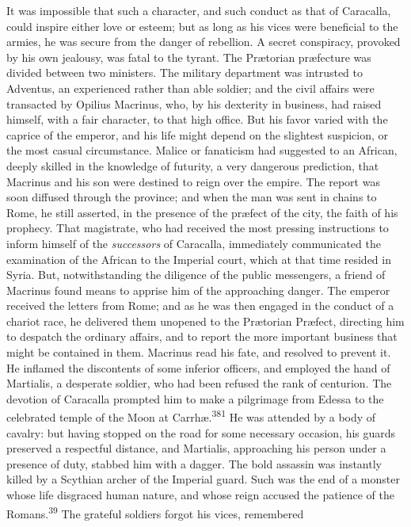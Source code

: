 It was impossible that such a character, and such conduct as that
of Caracalla, could inspire either love or esteem; but as long as
his vices were beneficial to the armies, he was secure from the
danger of rebellion. A secret conspiracy, provoked by his own
jealousy, was fatal to the tyrant. The Prætorian præfecture was
divided between two ministers. The military department was
intrusted to Adventus, an experienced rather than able soldier;
and the civil affairs were transacted by Opilius Macrinus, who,
by his dexterity in business, had raised himself, with a fair
character, to that high office. But his favor varied with the
caprice of the emperor, and his life might depend on the
slightest suspicion, or the most casual circumstance. Malice or
fanaticism had suggested to an African, deeply skilled in the
knowledge of futurity, a very dangerous prediction, that Macrinus
and his son were destined to reign over the empire. The report
was soon diffused through the province; and when the man was sent
in chains to Rome, he still asserted, in the presence of the
præfect of the city, the faith of his prophecy. That magistrate,
who had received the most pressing instructions to inform himself
of the \textit{successors} of Caracalla, immediately communicated the
examination of the African to the Imperial court, which at that
time resided in Syria. But, notwithstanding the diligence of the
public messengers, a friend of Macrinus found means to apprise
him of the approaching danger. The emperor received the letters
from Rome; and as he was then engaged in the conduct of a chariot
race, he delivered them unopened to the Prætorian Præfect,
directing him to despatch the ordinary affairs, and to report the
more important business that might be contained in them. Macrinus
read his fate, and resolved to prevent it. He inflamed the
discontents of some inferior officers, and employed the hand of
Martialis, a desperate soldier, who had been refused the rank of
centurion. The devotion of Caracalla prompted him to make a
pilgrimage from Edessa to the celebrated temple of the Moon at
Carrhæ.\textsuperscript{381} He was attended by a body of cavalry: but having
stopped on the road for some necessary occasion, his guards
preserved a respectful distance, and Martialis, approaching his
person under a presence of duty, stabbed him with a dagger. The
bold assassin was instantly killed by a Scythian archer of the
Imperial guard. Such was the end of a monster whose life
disgraced human nature, and whose reign accused the patience of
the Romans.\textsuperscript{39} The grateful soldiers forgot his vices, remembered
